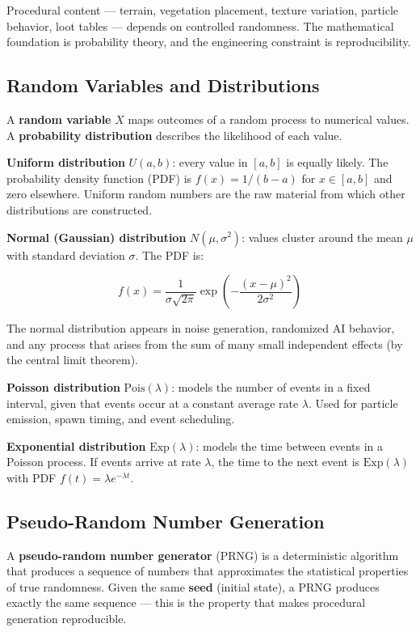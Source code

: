 \documentclass[
  11pt,
  letterpaper,
  DIV=11,
  numbers=noendperiod,
  twoside,
  open=right]{scrreprt}
\begin{document}
Procedural content --- terrain, vegetation placement, texture variation,
particle behavior, loot tables --- depends on controlled randomness. The
mathematical foundation is probability theory, and the engineering
constraint is reproducibility.

\subsection{Random Variables and
Distributions}\label{random-variables-and-distributions}

A \textbf{random variable} \(X\) maps outcomes of a random process to
numerical values. A \textbf{probability distribution} describes the
likelihood of each value.

\textbf{Uniform distribution} \(U(a, b)\): every value in \([a, b]\) is
equally likely. The probability density function (PDF) is
\(f(x) = 1/(b - a)\) for \(x \in [a, b]\) and zero elsewhere. Uniform
random numbers are the raw material from which other distributions are
constructed.

\textbf{Normal (Gaussian) distribution} \(N(\mu, \sigma^2)\): values
cluster around the mean \(\mu\) with standard deviation \(\sigma\). The
PDF is:

\[
f(x) = \frac{1}{\sigma\sqrt{2\pi}} \exp\left(-\frac{(x - \mu)^2}{2\sigma^2}\right)
\]

The normal distribution appears in noise generation, randomized AI
behavior, and any process that arises from the sum of many small
independent effects (by the central limit theorem).

\textbf{Poisson distribution} \(\text{Pois}(\lambda)\): models the
number of events in a fixed interval, given that events occur at a
constant average rate \(\lambda\). Used for particle emission, spawn
timing, and event scheduling.

\textbf{Exponential distribution} \(\text{Exp}(\lambda)\): models the
time between events in a Poisson process. If events arrive at rate
\(\lambda\), the time to the next event is \(\text{Exp}(\lambda)\) with
PDF \(f(t) = \lambda e^{-\lambda t}\).

\subsection{Pseudo-Random Number
Generation}\label{pseudo-random-number-generation}

A \textbf{pseudo-random number generator} (PRNG) is a deterministic
algorithm that produces a sequence of numbers that approximates the
statistical properties of true randomness. Given the same \textbf{seed}
(initial state), a PRNG produces exactly the same sequence --- this is
the property that makes procedural generation reproducible.
\end{document}
